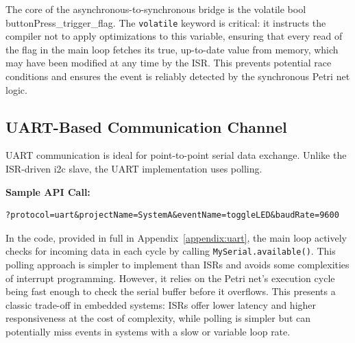 The core of the asynchronous-to-synchronous bridge is the volatile bool buttonPress\_trigger\_flag. The \texttt{volatile} keyword is critical: it instructs the compiler not to apply optimizations to this variable, ensuring that every read of the flag in the main loop fetches its true, up-to-date value from memory, which may have been modified at any time by the ISR. This prevents potential race conditions and ensures the event is reliably detected by the synchronous Petri net logic.

\subsection{UART-Based Communication Channel}
UART communication is ideal for point-to-point serial data exchange. Unlike the ISR-driven \gls{i2c} slave, the UART implementation uses polling.

\noindent\textbf{Sample API Call:}
\begin{verbatim}
?protocol=uart&projectName=SystemA&eventName=toggleLED&baudRate=9600
\end{verbatim}

In the code, provided in full in Appendix~\ref{appendix:uart}, the main loop actively checks for incoming data in each cycle by calling \texttt{MySerial.available()}. This polling approach is simpler to implement than ISRs and avoids some complexities of interrupt programming. However, it relies on the Petri net's execution cycle being fast enough to check the serial buffer before it overflows. This presents a classic trade-off in embedded systems: ISRs offer lower latency and higher responsiveness at the cost of complexity, while polling is simpler but can potentially miss events in systems with a slow or variable loop rate.

